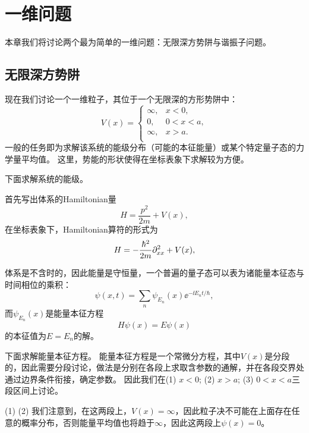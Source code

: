 
\section{一维问题}
\label{sec:one_dim}

本章我们将讨论两个最为简单的一维问题：无限深方势阱与谐振子问题。

\subsection{无限深方势阱}
\label{subsec:onedim_inf_square}

现在我们讨论一个一维粒子，其位于一个无限深的方形势阱中：
\begin{equation}
    V(x) =
    \begin{cases}
        \infty, & x<0,  \\
        0,      & 0<x<a,\\
        \infty, & x>a.  \\
    \end{cases}
\end{equation}
一般的任务即为求解该系统的能级分布（可能的本征能量）或某个特定量子态的力学量平均值。
这里，势能的形状使得在坐标表象下求解较为方便。

下面求解系统的能级。

首先写出体系的Hamiltonian量
\begin{equation}
    H = \frac{p^2}{2m} + V(x),
\end{equation}
在坐标表象下，Hamiltonian算符的形式为
\begin{equation}
    H = -\frac{\hbar^2}{2m} \partial_{xx}^2 + V(x),
\end{equation}

体系是不含时的，因此能量是守恒量，一个普遍的量子态可以表为诸能量本征态与时间相位的乘积：
\begin{equation}
    \psi(x,t) = \sum_n \psi_{E_n}(x) \ee^{-\ii E_n t/\hbar},
\end{equation}
而$\psi_{E_n}(x)$是能量本征方程
\begin{equation}
    H\psi(x) = E \psi(x)
\end{equation}
的本征值为$E=E_n$的解。

下面求解能量本征方程。
能量本征方程是一个常微分方程，其中$V(x)$是分段的，因此需要分段讨论，做法是分别在各段上求取含参数的通解，并在各段交界处通过边界条件衔接，确定参数。
因此我们在(1) $x<0$; (2) $x>a$; (3) $0<x<a$三段区间上讨论。

(1) (2) 我们注意到，在这两段上，$V(x)=\infty$，因此粒子决不可能在上面存在任意的概率分布，否则能量平均值也将趋于$\infty$，因此这两段上$\psi(x)=0$。

